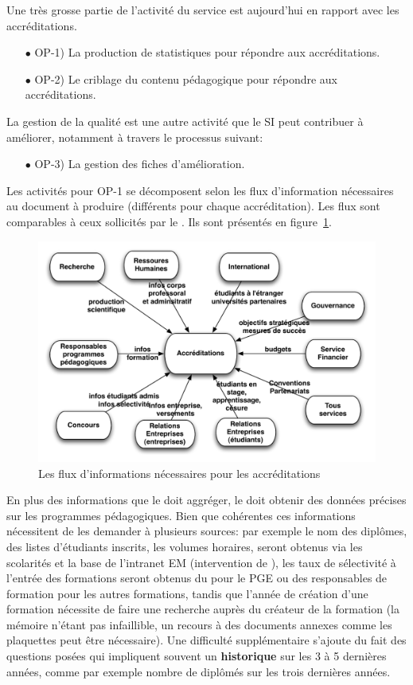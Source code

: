 \documentclass{book}
\begin{document}
Une très grosse partie de l'activité du service est aujourd'hui en rapport 
avec les accréditations. 
\begin{itemize}
\item[$\bullet$] OP-1) La production de statistiques pour répondre aux 
			     accréditations.
\item[$\bullet$] OP-2) Le criblage du contenu pédagogique pour répondre 
			     aux accréditations.
\end{itemize}
La gestion de la qualité est une autre activité que le SI peut contribuer à
améliorer, notamment à travers le processus suivant:
\begin{itemize}
\item[$\bullet$] OP-3) La gestion des fiches d'amélioration.
\end{itemize}
\bigskip
Les activités pour OP-1 se décomposent selon les flux d'information 
nécessaires au document à produire (différents pour chaque accréditation). 
Les flux sont comparables à ceux sollicités par le \scom. Ils sont présentés 
en figure~\ref{fg:accred_flux}.
\begin{figure}[hbt]
\begin{center}
\includegraphics[width=.75\linewidth]{figs/accred_flux.pdf}
\end{center}
\caption{Les flux d'informations nécessaires pour les accréditations}
\label{fg:accred_flux}
\end{figure}
En plus des informations que le \scom doit aggréger, le \sop doit obtenir des 
données précises sur les programmes pédagogiques. Bien que cohérentes ces 
informations nécessitent de les demander à plusieurs sources: par exemple
le nom des diplômes, des listes d'étudiants inscrits, les volumes horaires,
seront obtenus via les scolarités et la base de l'intranet EM (intervention de 
\CK), les taux de sélectivité à l'entrée des formations seront obtenus du \sconc 
pour le PGE ou des responsables de formation pour les autres formations, 
tandis que l'année de création d'une formation nécessite
de faire une recherche auprès du créateur de la formation (la mémoire n'étant
pas infaillible, un recours à des documents annexes comme les plaquettes peut
être nécessaire).
Une difficulté supplémentaire s'ajoute du fait des questions posées qui 
impliquent souvent un \textbf{historique} sur les 3 à 5 dernières années, comme 
par exemple nombre de diplômés sur les trois dernières années.
\end{document}
